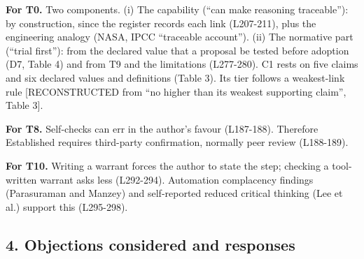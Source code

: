 {\textbf{For T0.} Two components. (i) The capability (``can make
reasoning traceable''): by construction, since the register records each
link (L207-211), plus the engineering analogy (NASA, IPCC ``traceable
account''). (ii) The normative part (``trial first''): from the declared
value that a proposal be tested before adoption (D7, Table 4) and from
T9 and the limitations (L277-280). C1 rests on five claims and six
declared values and definitions (Table 3). Its tier follows a
weakest-link rule {[}RECONSTRUCTED from ``no higher than its weakest
supporting claim'', Table 3{]}.

\textbf{For T8.} Self-checks can err in the author's favour (L187-188).
Therefore Established requires third-party confirmation, normally peer
review (L188-189).

\textbf{For T10.} Writing a warrant forces the author to state the step;
checking a tool-written warrant asks less (L292-294). Automation
complacency findings (Parasuraman and Manzey) and self-reported reduced
critical thinking (Lee et al.) support this (L295-298).

\subsection{4. Objections considered and
responses}\label{objections-considered-and-responses}

}
